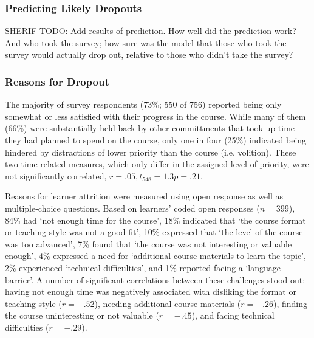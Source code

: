 \documentclass{sigchi}\usepackage[]{graphicx}\usepackage[]{color}
\begin{document}
\subsubsection{Predicting Likely Dropouts}

SHERIF TODO: Add results of prediction. How well did the prediction work? And who took the survey; how sure was the model that those who took the survey would actually drop out, relative to those who didn't take the survey?

\subsubsection{Reasons for Dropout}

The majority of survey respondents (73\%; 550 of 756) reported being only somewhat or less satisfied with their progress in the course. While many of them (66\%) were substantially held back by other committments that took up time they had planned to spend on the course, only one in four (25\%) indicated being hindered by distractions of lower priority than the course (i.e. volition). These two time-related measures, which only differ in the assigned level of priority, were not significantly correlated, $r=.05, t_{548}=1.3 p=.21$.

Reasons for learner attrition were measured using open response as well as multiple-choice questions. Based on learners' coded open responses ($n=399$), 84\% had `not enough time for the course', 18\% indicated that `the course format or teaching style was not a good fit', 10\% expressed that `the level of the course was too advanced', 7\% found that `the course was not interesting or valuable enough', 4\% expressed a need for `additional course materials to learn the topic', 2\% experienced `technical difficulties', and 1\% reported facing a `language barrier'. A number of significant correlations between these challenges stood out: having not enough time was negatively associated with disliking the format or teaching style ($r=-.52$), needing additional course materials ($r=-.26$), finding the course uninteresting or not valuable ($r=-.45$), and facing technical difficulties ($r=-.29$). 
\end{document}
